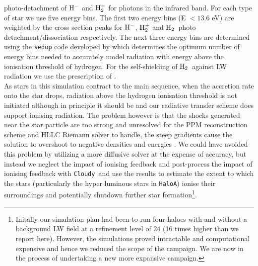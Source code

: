 \documentclass[twocolumn,iop,revtex4]{openjournal}
\newcommand{\cloudy}{\texttt{Cloudy~}}
\newcommand{\molH} {$\rm{H_2}$~}
\newcommand{\hac} {\texttt{HaloA}}
\begin{document}
photo-detachment of  $\rm{H^-}$ and $\rm{H_2^+}$ for photons in the infrared band. For each type of
star we use five energy bins. The first two energy bins (E $< 13.6$ eV) are weighted by the cross
section peaks for $\rm{H^-}$,  $\rm{H_2^+}$ and \molH photo detachment/dissociation respectively.
The next three energy bins are determined using the \texttt{sedop} code developed by
\cite{Mirocha_2012} which determines the optimum number of energy bins needed to
accurately model radiation with energy above the ionisation threshold of hydrogen. For the
self-shielding of \molH against LW radiation we use the prescription of \cite{Wolcott-Green_2011}.\\
\indent As stars in this simulation contract to the main sequence, when the accretion rate onto the
star drops, radiation above the hydrogen ionisation threshold is not initiated although in
principle it should be and our radiative transfer scheme does support ionising radiation. The
problem however is that the shocks generated near
the star particle are too strong and unresolved for the PPM reconstruction scheme and HLLC Riemann
solver to handle, the steep gradients cause the solution to overshoot to negative densities and
energies \citep[see][for details]{Enzo_2014}. We could have avoided this problem by utilizing a more
diffusive solver at the expense of accuracy, but instead
we neglect the impact of ionising feedback and post-process the impact of
ionising feedback with \cloudy and use the results to estimate the extent to which the stars
(particularly the hyper luminous stars in \hac) ionise their surroundings and potentially shutdown
further star formation\footnote{Initally our simulation plan had been to run four haloes with and without a background LW field at a refinement level of 24 (16 times higher than we report here). However, the simulations proved intractable and computational expensive and hence we reduced the scope of the campaign. We are now in the process of undertaking a new more expansive campaign.}.
 
\end{document}
